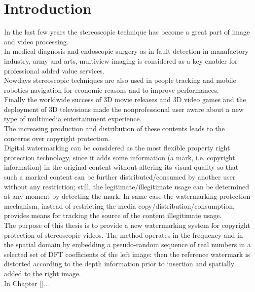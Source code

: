 \chapter*{Introduction}
\label{intro}
{}

In the last few years the stereoscopic technique has become a great part of image and video processing.\\
In medical diagnosis and endoscopic surgery as in fault detection in manufactory industry, army and arts,
multiview imaging is considered as a key enabler  for professional added value services.\\
Nowdays stereoscopic techniques are also used in people tracking and mobile robotics
navigation for economic reasons and to improve performances.\\
Finally the worldwide success of 3D movie releases and 3D video games and the deployment of 3D televisions made the nonprofessional user aware about a new type of multimedia entertainment experience.\\
The increasing production and distribution of these contents leads to the concerns over copyright protection.\\
Digital watermarking can be considered as the most flexible property right protection technology, since it adds some information (a mark, i.e. copyright information) in the
original content without altering its visual quality so that such a marked content can be further distributed/consumed by another user without any restriction; still, the legitimate/illegitimate usage can be determined at any moment by detecting the mark. In same case the watermarking protection mechanism, instead of restricting the media copy/distribution/consumption, provides means for tracking the source of the content illegitimate usage.\\
The purpose of this thesis is to provide a new watermarking system for copyright protection of stereoscopic videos. The method operates in the frequency and in the spatial domain by embedding a pseudo-random sequence of real numbers in a selected set of DFT coefficients of the left image; then the reference watermark is distorted according to the depth information prior to insertion and spatially added to the right image.\\
In Chapter \ref{}...